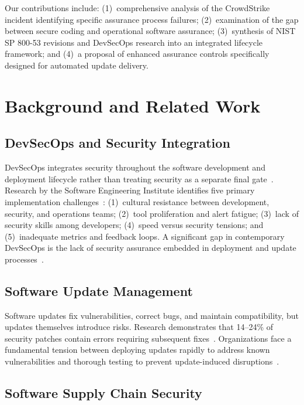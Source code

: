 \documentclass[sigconf,nonacm]{acmart}
\begin{document}
Our contributions include: (1)~comprehensive analysis of the CrowdStrike incident
identifying specific assurance process failures; (2)~examination of the gap between secure
coding and operational software assurance; (3)~synthesis of NIST SP 800-53 revisions and
DevSecOps research into an integrated lifecycle framework; and (4)~a proposal of enhanced
assurance controls specifically designed for automated update delivery.

\section{Background and Related Work}

\subsection{DevSecOps and Security Integration}

DevSecOps integrates security throughout the software development and deployment lifecycle
rather than treating security as a separate final gate~\cite{shahin2021continuous}. Research
by the Software Engineering Institute identifies five primary implementation
challenges~\cite{yankel2022devsecops}: (1)~cultural resistance between development, security,
and operations teams; (2)~tool proliferation and alert fatigue; (3)~lack of security skills
among developers; (4)~speed versus security tensions; and (5)~inadequate metrics and
feedback loops. A significant gap in contemporary DevSecOps is the lack of security
assurance embedded in deployment and update
processes~\cite{rajapakse2022challenges}.

\subsection{Software Update Management}

Software updates fix vulnerabilities, correct bugs, and maintain compatibility, but
updates themselves introduce risks. Research demonstrates that 14--24\% of security patches
contain errors requiring subsequent fixes~\cite{xu2021empirical}. Organizations face a
fundamental tension between deploying updates rapidly to address known vulnerabilities and
thorough testing to prevent update-induced disruptions~\cite{householder2020cvd}.

\subsection{Software Supply Chain Security}
\end{document}
